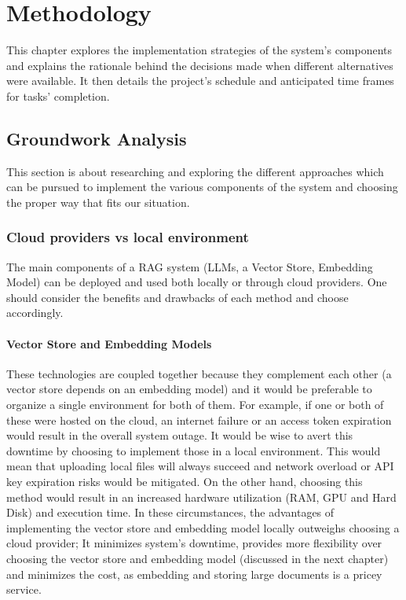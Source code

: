 \chapter{Methodology}
This chapter explores the implementation strategies of the system's components and explains the rationale behind the decisions made when different alternatives were available. It then details the project's schedule and anticipated time frames for tasks' completion.
\newpage

\section{Groundwork Analysis}
This section is about researching and exploring the different approaches which can be pursued to implement the various components of the system and choosing the proper way that fits our situation.
\subsection{Cloud providers vs local environment}
The main components of a RAG system (LLMs, a Vector Store, Embedding Model) can be deployed and used both locally or through cloud providers. One should consider the benefits and drawbacks of each method and choose accordingly.
\subsubsection{Vector Store and Embedding Models}
These technologies are coupled together because they complement each other (a vector store depends on an embedding model) and it would be preferable to organize a single environment for both of them. For example, if one or both of these were hosted on the cloud, an internet failure or an access token expiration would result in the overall system outage. It would be wise to avert this downtime by choosing to implement those in a local environment. This would mean that uploading local files will always succeed and network overload or API key expiration risks would be mitigated.\newline
On the other hand, choosing this method would result in an increased hardware utilization (RAM, GPU and Hard Disk) and execution time.\newline
In these circumstances, the advantages of implementing the vector store and embedding model locally outweighs choosing a cloud provider; It minimizes system's downtime, provides more flexibility over choosing the vector store and embedding model (discussed in the next chapter) and minimizes the cost, as embedding and storing large documents is a pricey service.
